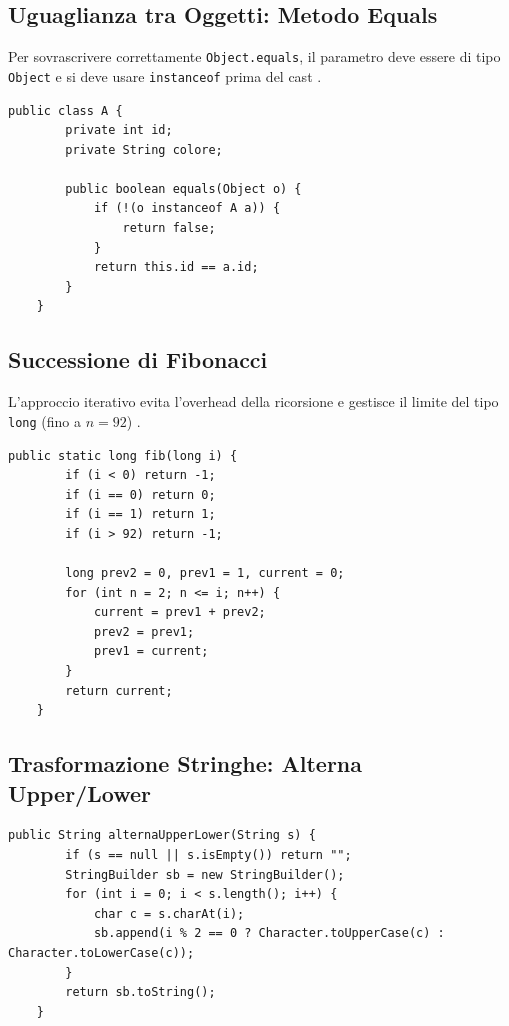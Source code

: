\subsection{Uguaglianza tra Oggetti: Metodo Equals}
\begin{hardnote}
	Per sovrascrivere correttamente \texttt{Object.equals}, il parametro deve essere di tipo \texttt{Object} e si deve usare \texttt{instanceof} prima del cast \cite{222, 170}.
\end{hardnote}

\begin{lstlisting}[caption={Override di equals per la classe A}]
	public class A {
		private int id;
		private String colore;
		
		public boolean equals(Object o) {
			if (!(o instanceof A a)) {
				return false;
			}
			return this.id == a.id;
		}
	}
\end{lstlisting}

\subsection{Successione di Fibonacci}
\begin{nota}
	L'approccio iterativo evita l'overhead della ricorsione e gestisce il limite del tipo \texttt{long} (fino a $n=92$) \cite{227, 171}.
\end{nota}

\begin{lstlisting}[caption={Fibonacci iterativo}]
	public static long fib(long i) {
		if (i < 0) return -1;
		if (i == 0) return 0;
		if (i == 1) return 1;
		if (i > 92) return -1;
		
		long prev2 = 0, prev1 = 1, current = 0;
		for (int n = 2; n <= i; n++) {
			current = prev1 + prev2;
			prev2 = prev1;
			prev1 = current;
		}
		return current;
	}
\end{lstlisting}

\newpage
\subsection{Trasformazione Stringhe: Alterna Upper/Lower}
\begin{lstlisting}[caption={Metodo alternaUpperLower}]
	public String alternaUpperLower(String s) {
		if (s == null || s.isEmpty()) return "";
		StringBuilder sb = new StringBuilder();
		for (int i = 0; i < s.length(); i++) {
			char c = s.charAt(i);
			sb.append(i % 2 == 0 ? Character.toUpperCase(c) : Character.toLowerCase(c));
		}
		return sb.toString();
	}
\end{lstlisting}


